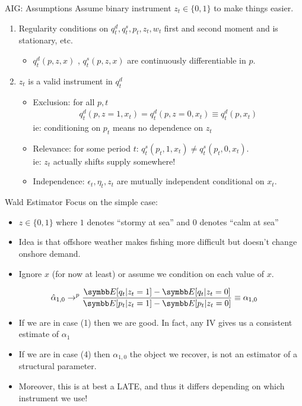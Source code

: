 \documentclass[aspectratio=169,11pt]{beamer}
\begin{document}
\begin{frame}{AIG: Assumptions}
Assume binary instrument $z_{t} \in \{0,1\}$ to make things easier.
\begin{enumerate}
\item Regularity conditions on $q_t^d, q_t^s,p_t,z_t,w_t$ first and second moment and is stationary, etc.
\begin{itemize}
\item  $q_t^d(p,z,x)$ ,  $q_t^s(p,z,x)$ are continuously differentiable in $p$.
\end{itemize}
\item $z_t$ is a valid instrument in $q_t^d$
\begin{itemize}
\item Exclusion: for all $p,t$ 
\begin{eqnarray*}
q_t^d(p,z=1,x_t) = q_t^d(p,z=0,x_t) \equiv q_t^d(p,x_t)
\end{eqnarray*}
ie: conditioning on $p_t$ means no dependence on $z_t$
\item Relevance: for some period $t$: $q_t^s(p_t,1,x_t) \neq q_t^s(p_t,0,x_t)$.\\
ie: $z_t$ actually shifts supply somewhere!
\item Independence: $\epsilon_t, \eta_t, z_t$ are mutually independent conditional on $x_t$.
\end{itemize}
\end{enumerate}
\end{frame}

\begin{frame}{Wald Estimator}
Focus on the simple case:
\begin{itemize}
\item $z \in \{0,1\}$ where $1$ denotes ``stormy at sea'' and 0 denotes ``calm at sea''
\item Idea is that offshore weather makes fishing more difficult but doesn't change onshore demand.
\item Ignore $x$ (for now at least) or assume we condition on each value of $x$.
\end{itemize}
\begin{eqnarray*}
\hat{\alpha}_{1,0}  \rightarrow^p \frac{\E[q_t | z_t=1] - \E[q_t | z_t=0]}{\E[p_t | z_t=1] - \E[p_t | z_t =0]} \equiv \alpha_{1,0}
\end{eqnarray*}
\begin{itemize}
\item If we are in case (1) then we are good. In fact, any IV gives us a consistent estimate of $\alpha_1$
\item If we are in case (4) then $\alpha_{1,0}$ the object we recover, is not an estimator of a structural parameter.
\item Moreover, this is at best a LATE, and thus it differs depending on which instrument we use!
\end{itemize}
\end{frame}
\end{document}

